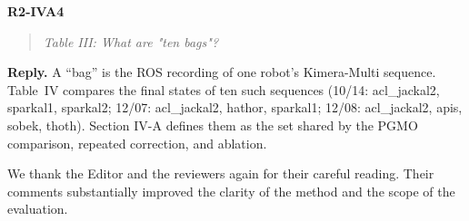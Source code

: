 \documentclass[11pt,a4paper]{article}
\newcommand{\point}[2]{\par\medskip\textbf{#1}\par\begin{quote}\itshape #2\end{quote}}
\newenvironment{reply}{\begingroup\color{replyblue}\textbf{Reply.} }{\par\endgroup}
\begin{document}
\point{R2-IVA4}{Table III: What are "ten bags"?}
\begin{reply}
A ``bag'' is the ROS recording of one robot's Kimera-Multi sequence. Table~IV compares the final states of ten such sequences (10/14: acl\_jackal2, sparkal1, sparkal2; 12/07: acl\_jackal2, hathor, sparkal1; 12/08: acl\_jackal2, apis, sobek, thoth). Section IV-A defines them as the set shared by the PGMO comparison, repeated correction, and ablation.
\end{reply}

\bigskip
We thank the Editor and the reviewers again for their careful reading. Their comments substantially improved the clarity of the method and the scope of the evaluation.

\end{document}
